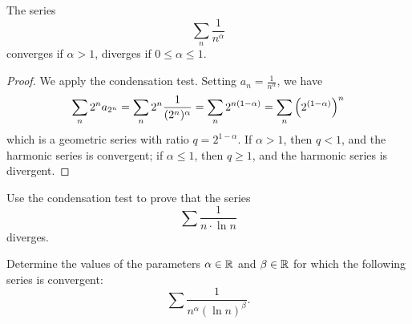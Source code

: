 \begin{corollary}
\mymark{***}
%
The series
\[
 \sum_n \frac{1}{n^\alpha}
\]
converges if $\alpha>1$,
diverges if $0\le \alpha\le 1$.
\end{corollary}
%
\begin{proof}
\mymark{***}
We apply the condensation test. Setting $a_n = \frac 1{n^\alpha}$, we have
\[
  \sum_n 2^n a_{2^n} = \sum_n 2^n \frac{1}{(2^n)^\alpha}
  = \sum_n 2^{n(1-\alpha)}
  = \sum_n {\left( 2^{(1-\alpha)} \right)}^n
\]
which is a geometric series with ratio $q=2^{1-\alpha}$.
If $\alpha>1$, then $q<1$, and the harmonic series is convergent; if $\alpha \le
1$, then $q\ge 1$, and the harmonic series is divergent.
\end{proof}

\begin{exercise}
Use the condensation test to prove that the series
\[
  \sum \frac{1}{n \cdot \ln n}
\]
diverges.
\end{exercise}

\begin{exercise}
    Determine the values of the parameters $\alpha\in {\mathbb R}$ and $\beta\in {\mathbb R}$
  for which the following series is convergent:
  \[
    \sum \frac{1}{n^\alpha (\ln n)^\beta}.
  \]
\end{exercise}